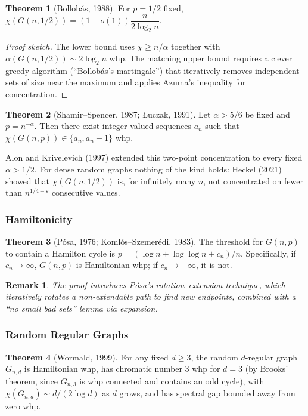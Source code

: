 \documentclass{article}
\newtheorem{remark}{Remark}
\theoremstyle{definition}
\newtheorem{theorem}{Theorem}
\begin{document}
\begin{theorem}[Bollob\'as, 1988]
For $p = 1/2$ fixed, $\chi(G(n, 1/2)) = (1 + o(1)) \dfrac{n}{2 \log_2 n}$.
\end{theorem}

\begin{proof}[Proof sketch]
The lower bound uses $\chi \ge n/\alpha$ together with
$\alpha(G(n, 1/2)) \sim 2\log_2 n$ whp. The matching upper bound
requires a clever greedy algorithm (``Bollob\'as's martingale'') that
iteratively removes independent sets of size near the maximum and
applies Azuma's inequality for concentration.
\end{proof}

\begin{theorem}[Shamir--Spencer, 1987; \L uczak, 1991]
Let $\alpha > 5/6$ be fixed and $p = n^{-\alpha}$. Then there exist
integer-valued sequences $a_n$ such that
$\chi(G(n, p)) \in \{a_n, a_n + 1\}$ whp.
\end{theorem}

Alon and Krivelevich (1997) extended this two-point concentration to
every fixed $\alpha > 1/2$. For dense random graphs nothing of the kind
holds: Heckel (2021) showed that $\chi(G(n, 1/2))$ is, for infinitely many
$n$, not concentrated on fewer than $n^{1/4 - \varepsilon}$ consecutive values.

\subsubsection{Hamiltonicity}

\begin{theorem}[P\'osa, 1976; Koml\'os--Szemer\'edi, 1983]
The threshold for $G(n, p)$ to contain a Hamilton cycle is
$p = (\log n + \log \log n + c_n)/n$. Specifically, if $c_n \to \infty$,
$G(n, p)$ is Hamiltonian whp; if $c_n \to -\infty$, it is not.
\end{theorem}

\begin{remark}
The proof introduces \emph{P\'osa's rotation--extension} technique,
which iteratively rotates a non-extendable path to find new endpoints,
combined with a ``no small bad sets'' lemma via expansion.
\end{remark}

\subsubsection{Random Regular Graphs}

\begin{theorem}[Wormald, 1999]
For any fixed $d \ge 3$, the random $d$-regular graph $G_{n, d}$ is
Hamiltonian whp, has chromatic number $3$ whp for $d = 3$ (by Brooks'
theorem, since $G_{n,3}$ is whp connected and contains an odd cycle),
with $\chi(G_{n,d}) \sim d/(2\log d)$ as $d$ grows, and has spectral gap
bounded away from zero whp.
\end{theorem}
\end{document}
